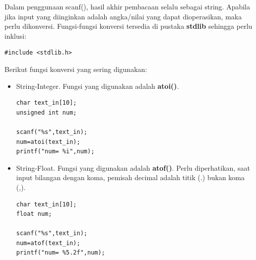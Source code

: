 \documentclass[12pt,]{article}
\begin{document}
	Dalam penggunaan scanf(), hasil akhir pembacaan selalu sebagai string.
	Apabila jika input yang diinginkan adalah angka/nilai yang dapat dioperasikan, maka perlu dikonversi.
	Fungsi-fungsi konversi tersedia di pustaka \textbf{stdlib} sehingga perlu inklusi:
	\begin{verbatim}
#include <stdlib.h>
	\end{verbatim}
	
	Berikut fungsi konversi yang sering digunakan:
	\begin{itemize}
		\item String-Integer. Fungsi yang digunakan adalah \textbf{atoi()}.
		\begin{verbatim}
char text_in[10];
unsigned int num;

scanf("%s",text_in);
num=atoi(text_in);
printf("num= %i",num);
		\end{verbatim}
		
		\item String-Float. Fungsi yang digunakan adalah \textbf{atof()}.
		Perlu diperhatikan, saat input bilangan dengan koma, pemisah decimal adalah titik (.) bukan koma (,).
		\begin{verbatim}
char text_in[10];
float num;

scanf("%s",text_in);
num=atof(text_in);
printf("num= %5.2f",num);
		\end{verbatim}
	
	\end{itemize}
\end{document}
